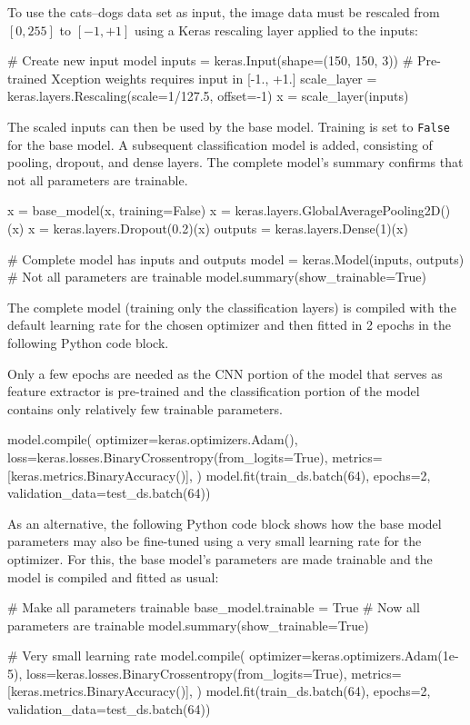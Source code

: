 To use the cats--dogs data set as input, the image data must be rescaled from $[0, 255]$ to $[-1, +1]$ using a Keras rescaling layer applied to the inputs:
\begin{pythoncode}
# Create new input model
inputs = keras.Input(shape=(150, 150, 3))
# Pre-trained Xception weights requires input in [-1., +1.]
scale_layer = keras.layers.Rescaling(scale=1/127.5, offset=-1)
x = scale_layer(inputs)
\end{pythoncode}

The scaled inputs can then be used by the base model. Training is set to \texttt{False} for the base model. A subsequent classification model is added, consisting of pooling, dropout, and dense layers. The complete model's summary confirms that not all parameters are trainable.
\begin{pythoncode}
x = base_model(x, training=False)
x = keras.layers.GlobalAveragePooling2D()(x)
x = keras.layers.Dropout(0.2)(x)
outputs = keras.layers.Dense(1)(x)

# Complete model has inputs and outputs
model = keras.Model(inputs, outputs)
# Not all parameters are trainable
model.summary(show_trainable=True)
\end{pythoncode}

The complete model (training only the classification layers) is compiled with the default learning rate for the chosen optimizer and then fitted in 2 epochs in the following Python code block. 

\begin{infobox}Only a few epochs are needed as the CNN portion of the model that serves as feature extractor is pre-trained and the classification portion of the model contains only relatively few trainable parameters.\end{infobox}

\begin{pythoncode}
model.compile(
    optimizer=keras.optimizers.Adam(),
    loss=keras.losses.BinaryCrossentropy(from_logits=True),
    metrics=[keras.metrics.BinaryAccuracy()],
)
model.fit(train_ds.batch(64), epochs=2, 
          validation_data=test_ds.batch(64))
\end{pythoncode}

As an alternative, the following Python code block shows how the base model parameters may also be fine-tuned using a very small learning rate for the optimizer. For this, the base model's parameters are made trainable and the model is compiled and fitted as usual:
\begin{pythoncode}
# Make all parameters trainable
base_model.trainable = True
# Now all parameters are trainable
model.summary(show_trainable=True)

# Very small learning rate
model.compile(
    optimizer=keras.optimizers.Adam(1e-5),
    loss=keras.losses.BinaryCrossentropy(from_logits=True),
    metrics=[keras.metrics.BinaryAccuracy()],
)
model.fit(train_ds.batch(64), epochs=2, 
          validation_data=test_ds.batch(64))
\end{pythoncode}

